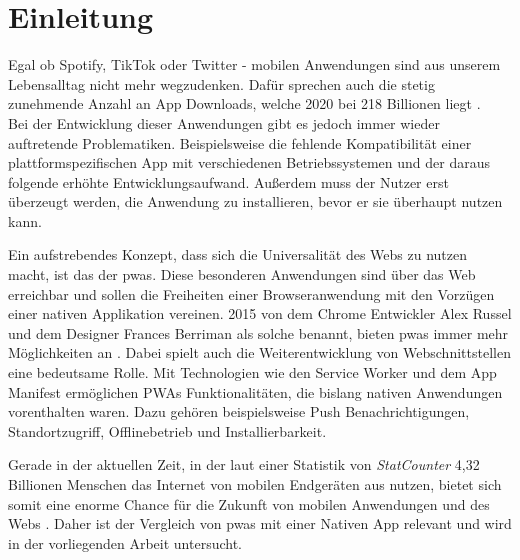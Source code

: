 \chapter{Einleitung}\label{ch:intro}
Egal ob Spotify, TikTok oder Twitter - mobilen Anwendungen sind aus unserem Lebensalltag nicht mehr wegzudenken.
Dafür sprechen auch die stetig zunehmende Anzahl an App Downloads, welche 2020 bei 218 Billionen liegt \cite{Iqbal.06.05.2021}.\\
Bei der Entwicklung dieser Anwendungen gibt es jedoch immer wieder auftretende Problematiken.
Beispielsweise die fehlende Kompatibilität einer plattformspezifischen App mit verschiedenen Betriebssystemen und der daraus folgende erhöhte Entwicklungsaufwand.
Außerdem muss der Nutzer erst überzeugt werden, die Anwendung zu installieren, bevor er sie überhaupt nutzen kann.

Ein aufstrebendes Konzept, dass sich die Universalität des Webs zu nutzen macht, ist das der \acp{pwa}.
Diese besonderen Anwendungen sind über das Web erreichbar und sollen die Freiheiten einer Browseranwendung mit den Vorzügen einer nativen Applikation vereinen.
2015 von dem Chrome Entwickler Alex Russel und dem Designer Frances Berriman als solche benannt, bieten \acp{pwa} immer mehr Möglichkeiten an \cite{Russell.2015}.
Dabei spielt auch die Weiterentwicklung von Webschnittstellen eine bedeutsame Rolle.
Mit Technologien wie den Service Worker und dem App Manifest ermöglichen PWAs Funktionalitäten, die bislang nativen Anwendungen vorenthalten waren.
Dazu gehören beispielsweise Push Benachrichtigungen, Standortzugriff, Offlinebetrieb und Installierbarkeit.

Gerade in der aktuellen Zeit, in der laut einer Statistik von \textit{StatCounter} 4,32 Billionen Menschen das Internet von mobilen Endgeräten aus nutzen, bietet sich somit eine enorme Chance für die Zukunft von mobilen Anwendungen und des Webs \cite{StatCounter.2021}.
Daher ist der Vergleich von \acp{pwa} mit einer Nativen App relevant und wird in der vorliegenden Arbeit untersucht.


